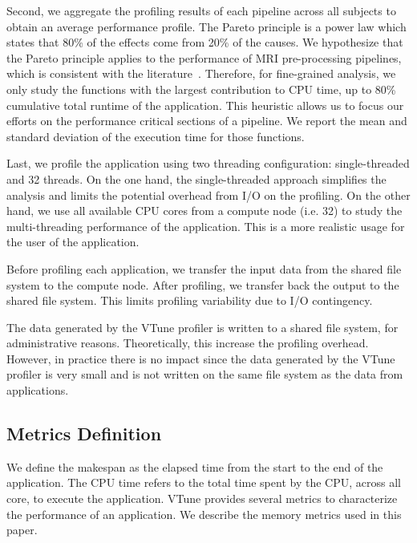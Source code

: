 \documentclass[conference]{IEEEtran}
\begin{document}
\begin{minipage}{\linewidth}
	
\end{minipage}
				
Second, we aggregate the profiling results of each pipeline across all subjects to obtain an average performance profile. The Pareto principle is a power law which states that 80\% of the effects come from 20\% of the causes. We hypothesize that the Pareto principle applies to the performance of MRI pre-processing pipelines, which is consistent with the literature~\cite{Kukunas2015-jd}. Therefore, for fine-grained analysis, we only study the functions with the largest contribution to CPU time, up to 80\% cumulative total runtime of the application. This heuristic allows us to focus our efforts on the performance critical sections of a pipeline. We report the mean and standard deviation of the execution time for those functions.
			
Last, we profile the application using two threading configuration: single-threaded and 32 threads. On the one hand, the single-threaded approach simplifies the analysis and limits the potential overhead from I/O on the profiling. 
On the other hand, we use all available CPU cores from a compute node (i.e. 32) to study the multi-threading performance of the application. This is a more realistic usage for the user of the application.
			
Before profiling each application, we transfer the input data from the shared file system to the compute node. After profiling, we transfer back the output to the shared file system. This limits profiling variability due to I/O contingency.
			
The data generated by the VTune profiler is written to a shared file system, for administrative reasons. Theoretically, this increase the profiling overhead. However, in practice there is no impact since the data generated by the VTune profiler is very small and is not written on the same file system as the data from applications.
			
\subsection{Metrics Definition}
We define the makespan as the elapsed time from the start to the end of the application. The CPU time refers to the total time spent by the CPU, across all core, to execute the application. VTune provides several metrics to characterize the performance of an application. We describe the memory metrics used in this paper.
			
\end{document}
